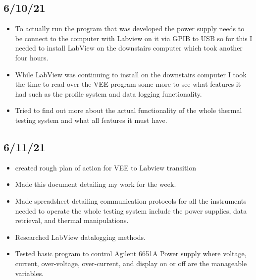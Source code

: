 \documentclass{article}
\begin{document}
\subsection*{6/10/21}
\begin{itemize}
    \item To actually run the program that was developed the power supply needs to be connect to the computer with Labview on it via GPIB to USB so for this I needed to install LabView on the downstairs computer which took another four hours.
    \item While LabView was continuing to install on the downstairs computer I took the time to read over the VEE program some more to see what features it had such as the profile system and data logging functionality.
    \item Tried to find out more about the actual functionality of the whole thermal testing system and what all features it must have.
\end{itemize}
\subsection*{6/11/21}
\begin{itemize}
    \item created rough plan of action for VEE to Labview transition
    \item Made this document detailing my work for the week.
    \item Made spreadsheet detailing communication protocols for all the instruments needed to operate the whole testing system include the power supplies, data retrieval, and thermal manipulations.
    \item Researched LabView datalogging methods.
    \item Tested basic program to control Agilent 6651A Power supply where voltage, current, over-voltage, over-current, and display on or off are the manageable variables.
\end{itemize}
\end{document}
